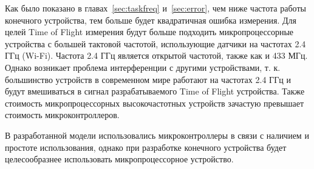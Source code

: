 Как было показано в главах~\ref{sec:taskfreq} и~\ref{sec:error}, чем ниже частота работы конечного устройства, тем больше будет квадратичная ошибка измерения. Для целей Time of Flight измерения будут больше подходить микропроцессорные устройства с большей тактовой частотой, использующие датчики на частотах 2.4 ГГц (Wi-Fi). Частота 2.4 ГГц является открытой частотой, также как и 433 МГц. Однако возникает проблема интерференции с другими устройствами, т. к. большинство устройств в современном мире работают на частотах 2.4 ГГц и будут вмешиваться в сигнал разрабатываемого Time of Flight устройства. Также стоимость микропроцессорных высокочастотных устройств зачастую превышает стоимость микроконтроллеров.

В разработанной модели использовались микроконтроллеры в связи с наличием и простоте использования, однако при разработке конечного устройства будет целесообразнее использовать микропроцессорное устройство.
